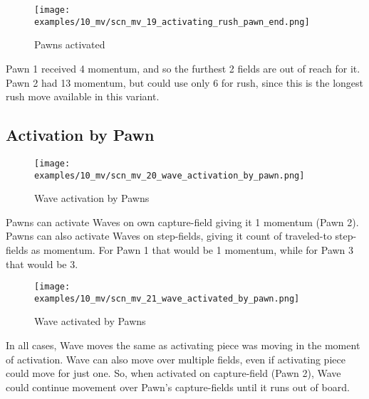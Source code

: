 \clearpage %

\noindent
\begin{figure}[!h]
\texttt{[image: examples/10\_mv/scn\_mv\_19\_activating\_rush\_pawn\_end.png]}
\caption{Pawns activated}
\label{fig:scn_mv_19_activating_rush_pawn_end}
\end{figure}

Pawn 1 received 4 momentum, and so the furthest 2 fields are out of reach for it.
Pawn 2 had 13 momentum, but could use only 6 for rush, since this is the longest
rush move available in this variant.

\clearpage %

\subsection*{Activation by Pawn}

\noindent
\begin{figure}[!h]
\texttt{[image: examples/10\_mv/scn\_mv\_20\_wave\_activation\_by\_pawn.png]}
\caption{Wave activation by Pawns}
\label{fig:scn_mv_20_wave_activation_by_pawn}
\end{figure}

Pawns can activate Waves on own capture-field giving it 1 momentum (Pawn 2).
Pawns can also activate Waves on step-fields, giving it count of traveled-to
step-fields as momentum. For Pawn 1 that would be 1 momentum, while for Pawn 3
that would be 3.

\clearpage %

\noindent
\begin{figure}[!h]
\texttt{[image: examples/10\_mv/scn\_mv\_21\_wave\_activated\_by\_pawn.png]}
\caption{Wave activated by Pawns}
\label{fig:scn_mv_21_wave_activated_by_pawn}
\end{figure}

In all cases, Wave moves the same as activating piece was moving in the moment of
activation. Wave can also move over multiple fields, even if activating piece could
move for just one. So, when activated on capture-field (Pawn 2), Wave could continue
movement over Pawn's capture-fields until it runs out of board.

